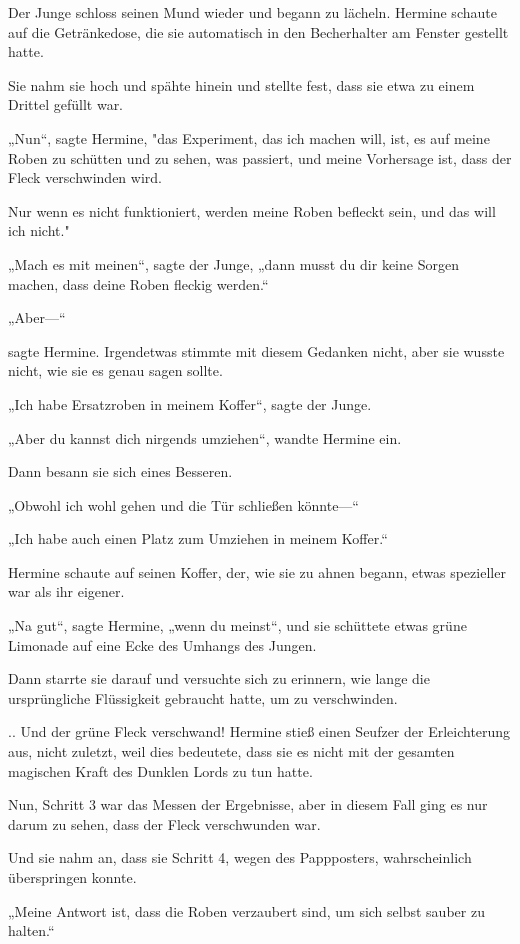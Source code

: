 {Der Junge schloss seinen Mund wieder und begann zu lächeln. Hermine schaute auf die Getränkedose, die sie automatisch in den Becherhalter am Fenster gestellt hatte.

Sie nahm sie hoch und spähte hinein und stellte fest, dass sie etwa zu einem Drittel gefüllt war.

„Nun“, sagte Hermine, "das Experiment, das ich machen will, ist, es auf meine Roben zu schütten und zu sehen, was passiert, und meine Vorhersage ist, dass der Fleck verschwinden wird.

Nur wenn es nicht funktioniert, werden meine Roben befleckt sein, und das will ich nicht."

„Mach es mit meinen“, sagte der Junge, „dann musst du dir keine Sorgen machen, dass deine Roben fleckig werden.“

„Aber—“

sagte Hermine. Irgendetwas stimmte mit diesem Gedanken nicht, aber sie wusste nicht, wie sie es genau sagen sollte.

„Ich habe Ersatzroben in meinem Koffer“, sagte der Junge.

„Aber du kannst dich nirgends umziehen“, wandte Hermine ein.

Dann besann sie sich eines Besseren.

„Obwohl ich wohl gehen und die Tür schließen könnte—“

„Ich habe auch einen Platz zum Umziehen in meinem Koffer.“

Hermine schaute auf seinen Koffer, der, wie sie zu ahnen begann, etwas spezieller war als ihr eigener.

„Na gut“, sagte Hermine, „wenn du meinst“, und sie schüttete etwas grüne Limonade auf eine Ecke des Umhangs des Jungen.

Dann starrte sie darauf und versuchte sich zu erinnern, wie lange die ursprüngliche Flüssigkeit gebraucht hatte, um zu verschwinden.

.. Und der grüne Fleck verschwand! Hermine stieß einen Seufzer der Erleichterung aus, nicht zuletzt, weil dies bedeutete, dass sie es nicht mit der gesamten magischen Kraft des Dunklen Lords zu tun hatte.

Nun, Schritt 3 war das Messen der Ergebnisse, aber in diesem Fall ging es nur darum zu sehen, dass der Fleck verschwunden war.

Und sie nahm an, dass sie Schritt 4, wegen des Pappposters, wahrscheinlich überspringen konnte.

„Meine Antwort ist, dass die Roben verzaubert sind, um sich selbst sauber zu halten.“

}
